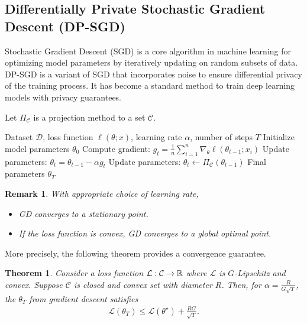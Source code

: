 \documentclass[11pt, a4paper]{article}
\newtheorem{theorem}{Theorem}
\newtheorem{remark}{Remark}
\begin{document}
\subsection{Differentially Private Stochastic Gradient Descent (DP-SGD)}

Stochastic Gradient Descent (SGD) is a core algorithm in machine learning for optimizing model parameters by iteratively updating on random subsets of data. DP-SGD \cite{Abadi2016} is a variant of SGD that incorporates noise to ensure differential privacy of the training process. It has become a standard method to train deep learning models with privacy guarantees.

Let $\Pi_{\mathcal{C}}$ is a projection method to a set $\mathcal{C}$.
\begin{algorithm}[H]
\caption{Gradient Descent (GD)}
\begin{algorithmic}[1]
\REQUIRE Dataset $\mathcal{D}$, loss function $\ell(\theta; x)$, learning rate $\alpha$, number of steps $T$
\STATE Initialize model parameters $\theta_0$
    \STATE Compute gradient: $g_t = \frac{1}{n} \sum_{i=1}^n \nabla_\theta \ell(\theta_{t-1}; x_i)$
    \STATE Update parameters: $\theta_t = \theta_{t-1} - \alpha g_t$
    \STATE Update parameters: $\theta_t \leftarrow \Pi_{\mathcal{C}}(\theta_{t-1})$
\ENDFOR
\RETURN Final parameters $\theta_T$
\end{algorithmic}
\end{algorithm}

\begin{remark}
    With appropriate choice of learning rate,
    \begin{itemize}
        \item GD converges to a stationary point.
        \item If the loss function is convex, GD converges to a global optimal point.
    \end{itemize}
\end{remark}

More precisely, the following theorem provides a convergence guarantee.
\begin{theorem}
    Consider a loss function $\mathcal{L}:\mathcal{C}\rightarrow \mathbb{R}$ where $\mathcal{L}$ is $G$-Lipschitz and convex.
    Suppose $\mathcal{C}$ is closed and convex set with diameter $R$.
    Then, for $\alpha = \frac{R}{G\sqrt{T}}$, the $\theta_T$ from gradient descent satisfies
    \begin{align}
        \mathcal{L}(\theta_T) \leq \mathcal{L}(\theta^\star) + \frac{RG}{\sqrt{T}}.
    \end{align}
\end{theorem}
\end{document}
